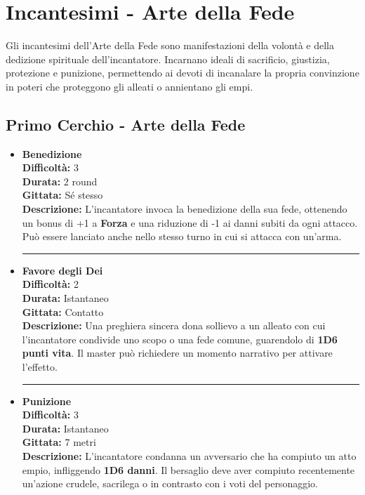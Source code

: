 \documentclass[../manuale_main.tex]{subfiles}
\begin{document}
\section{Incantesimi - Arte della Fede}

Gli incantesimi dell'Arte della Fede sono manifestazioni della volontà e della dedizione spirituale dell'incantatore. Incarnano ideali di sacrificio, giustizia, protezione e punizione, permettendo ai devoti di incanalare la propria convinzione in poteri che proteggono gli alleati o annientano gli empi.

 \subsection*{Primo Cerchio - Arte della Fede}

\begin{itemize}


\item \textbf{Benedizione} \\
\textbf{Difficoltà:} 3 \\
\textbf{Durata:} 2 round \\
\textbf{Gittata:} Sé stesso \\
\textbf{Descrizione:} L’incantatore invoca la benedizione della sua fede, ottenendo un bonus di +1 a \textbf{Forza} e una riduzione di -1 ai danni subiti da ogni attacco. Può essere lanciato anche nello stesso turno in cui si attacca con un'arma.

\vspace{0.5cm}\rule{\textwidth}{0.4pt}\vspace{1cm}

\item \textbf{Favore degli Dei} \\
\textbf{Difficoltà:} 2 \\
\textbf{Durata:} Istantaneo \\
\textbf{Gittata:} Contatto \\
\textbf{Descrizione:} Una preghiera sincera dona sollievo a un alleato con cui l’incantatore condivide uno scopo o una fede comune, guarendolo di \textbf{1D6 punti vita}. Il master può richiedere un momento narrativo per attivare l’effetto.

\vspace{0.5cm}\rule{\textwidth}{0.4pt}\vspace{1cm}

\clearpage
\item \textbf{Punizione} \\
\textbf{Difficoltà:} 3 \\
\textbf{Durata:} Istantaneo \\
\textbf{Gittata:} 7 metri \\
\textbf{Descrizione:} L’incantatore condanna un avversario che ha compiuto un atto empio, infliggendo \textbf{1D6 danni}. Il bersaglio deve aver compiuto recentemente un’azione crudele, sacrilega o in contrasto con i voti del personaggio.


\end{itemize}
\end{document}
